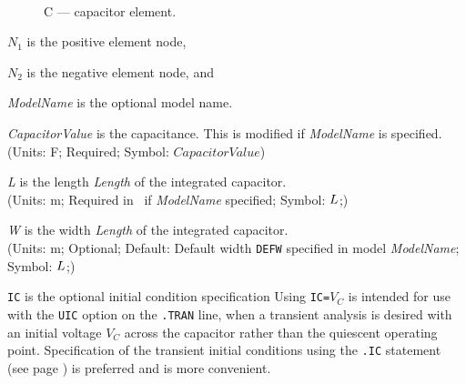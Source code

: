 \begin{figure}[h]
\centering
\ 
\caption{C --- capacitor element. \label{c:fig}}
\end{figure}
\begin{widelist}
\item[$N_1$] is the positive element node,
\item[$N_2$] is the negative element  node, and
\item[{\it ModelName}]  is  the optional  model name.
\item[{\it CapacitorValue}]  is  the  capacitance.  This is
               modified if {\it ModelName} is specified.\\
               (Units: F; Required; Symbol: $CapacitorValue$)

\item[{\it L}] is the length {\it Length} of the integrated capacitor.\\
               (Units: m; Required in \spicethree\ if {\it ModelName}
               specified; Symbol: $L$;)
\item[{\it W}] is the width {\it Length} of the integrated capacitor.\\
               (Units: m; Optional; Default: Default width {\tt DEFW}
               specified in model {\it ModelName}; Symbol: $L$;)\\

\item[{\tt IC}] is the optional  initial condition specification
      Using {\tt IC=}$V_C$ is intended for use with the {\tt UIC} option
      on  the  {\tt .TRAN}  line,  when  a transient analysis is desired
      with an initial voltage $V_C$ across the capacitor
      rather than the quiescent operating point.
      Specification of the transient initial conditions using the {\tt .IC}
      statement (see page \pageref{.ICstatement}) is preferred and is more
      convenient.
\end{widelist}


